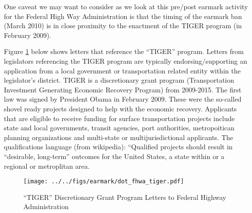 \documentclass{article}
\begin{document}
 One caveat we may want to consider as we look at this pre/post earmark activity for the Federal High Way Administration is that the timing of the earmark ban (March 2010) is in close proximity to the enactment of the TIGER program (in February 2009).  
 
 \clearpage

Figure \ref{f:highwaytiger} below shows letters that reference the ``TIGER'' program. Letters from legislators referencing the TIGER program are typically endorsing/supporting an application from a local government or transportation related entity within the legislator's district. TIGER is a discretionary grant program (Transportation Investment Generating Economic Recovery Program) from 2009-2015. The first law was signed by President Obama in February 2009. These were the so-called shovel ready projects designed to help with the economic recovery. Applicants that are eligible to receive funding for surface transportation projects include state and local governments, transit agencies, port authorities, metropoitican planning organizations and multi-state or multijurisdictional applicants.  The qualifications language (from wikipedia): ``Qualified projects should result in ``desirable, long-term'' outcomes for the United States, a state within or a regional or metroplitan area.  


\begin{figure}[ht!]
\caption{``TIGER'' Discretionary Grant Program Letters to Federal Highway Administration}\label{f:highwaytiger}
\centering
\texttt{[image: ../../figs/earmark/dot\_fhwa\_tiger.pdf]}
\end{figure}

\clearpage
{}

\end{document}

